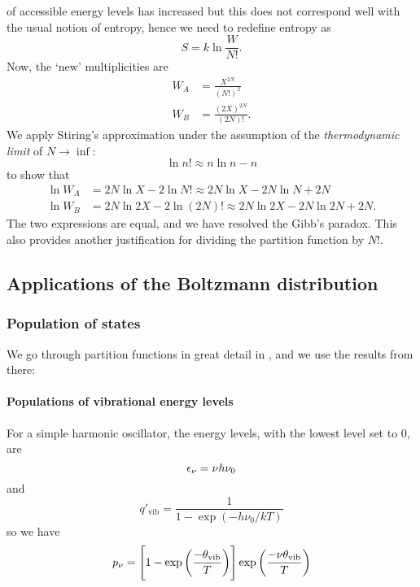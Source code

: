 of accessible energy levels has increased but this does not correspond well with the usual notion of entropy, hence we need to redefine entropy as
\begin{equation}
S=k\ln\frac{W}{N!}.
\end{equation}
Now, the `new' multiplicities are 
\begin{subequations}
\begin{align}
W_A&=\frac{X^{2N}}{(N!)^2}\\
W_B&=\frac{(2X)^{2N}}{(2N)!}.
\end{align}
\end{subequations}
We apply Stiring's approximation under the assumption of the \textit{thermodynamic limit} of $N\rightarrow\inf$: 
\begin{equation}
\ln n!\approx n\ln n-n
\end{equation}
to show that
\begin{subequations}
\begin{align}
\ln W_A&=2N\ln X-2\ln N!\approx 2N\ln X-2N\ln N+2N \\
\ln W_B&=2N\ln 2X-2\ln (2N)!\approx 2N\ln 2X-2N\ln 2N+2N.
\end{align}
\end{subequations}
The two expressions are equal, and we have resolved the Gibb's paradox. 
This also provides another justification for dividing the partition function by $N!$. 

\subsection{Applications of the Boltzmann distribution}
\subsubsection{Population of states}
We go through partition functions in great detail in , and we use the results from there:
\paragraph{Populations of vibrational energy levels}
For a simple harmonic oscillator, the energy levels, with the lowest level set to 0, are
\begin{equation}
  \epsilon_{\nu}=\nu h\nu_0
\end{equation}
and 
\begin{equation}
  q'_{\text{vib}}=\frac{1}{1-\exp(-h\nu_0/kT)}
\end{equation}
so we have
\begin{equation}
  p_{\nu}=\left[1-\exp\left(\frac{-\theta_{\text{vib}}}{T}\right) \right]\exp \left(\frac{-\nu\theta_{\text{vib}}}{T} \right)
\end{equation}

